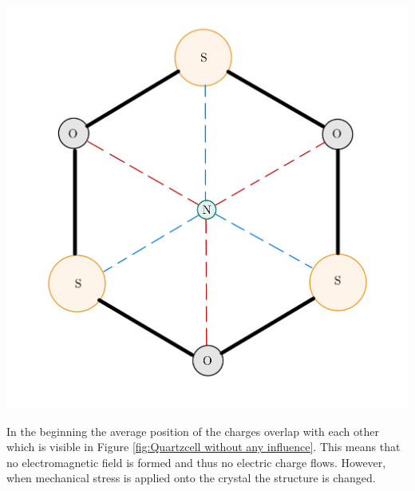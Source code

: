 \begin{minipage}{0.33\textwidth}
    \includegraphics[width=\textwidth]{./Figure_2.jpg}
    \label{fig:Quartzcell without any influence}
\end{minipage}
\begin{minipage}{0.66\textwidth}
    In the beginning the average position of the charges overlap with each other which is visible in Figure \ref{fig:Quartzcell without any influence}. This means that no electromagnetic field is formed and thus no electric charge flows. However, when mechanical stress is applied onto the crystal the structure is changed.\cite{Mould2019}\\
\end{minipage}
